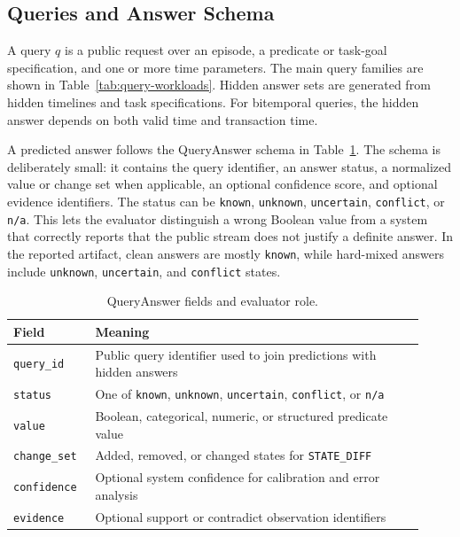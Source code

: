 \subsection{Queries and Answer Schema}

A query $q$ is a public request over an episode, a predicate or task-goal specification, and one or more time parameters. The main query families are shown in Table~\ref{tab:query-workloads}. Hidden answer sets are generated from hidden timelines and task specifications. For bitemporal queries, the hidden answer depends on both valid time and transaction time.


A predicted answer follows the QueryAnswer schema in Table~\ref{tab:answer-schema}. The schema is deliberately small: it contains the query identifier, an answer status, a normalized value or change set when applicable, an optional confidence score, and optional evidence identifiers. The status can be \texttt{known}, \texttt{unknown}, \texttt{uncertain}, \texttt{conflict}, or \texttt{n/a}. This lets the evaluator distinguish a wrong Boolean value from a system that correctly reports that the public stream does not justify a definite answer. In the reported artifact, clean answers are mostly \texttt{known}, while hard-mixed answers include \texttt{unknown}, \texttt{uncertain}, and \texttt{conflict} states.

\begin{table}[!t]
\caption{QueryAnswer fields and evaluator role.}
\label{tab:answer-schema}
\centering
\scriptsize
\setlength{\tabcolsep}{3pt}
\renewcommand{\arraystretch}{1.13}
\begingroup
{}
\begin{tabular}{@{}p{0.18\linewidth}p{0.74\linewidth}@{}}
\toprule
\rowcolor{gray!15}
\textbf{Field} & \textbf{Meaning} \\
\midrule
\texttt{query\_id} & Public query identifier used to join predictions with hidden answers \\
\texttt{status} & One of \texttt{known}, \texttt{unknown}, \texttt{uncertain}, \texttt{conflict}, or \texttt{n/a} \\
\texttt{value} & Boolean, categorical, numeric, or structured predicate value \\
\texttt{change\_set} & Added, removed, or changed states for \texttt{STATE\_DIFF} \\
\texttt{confidence} & Optional system confidence for calibration and error analysis \\
\texttt{evidence} & Optional support or contradict observation identifiers \\
\bottomrule
\end{tabular}
\endgroup
\end{table}


